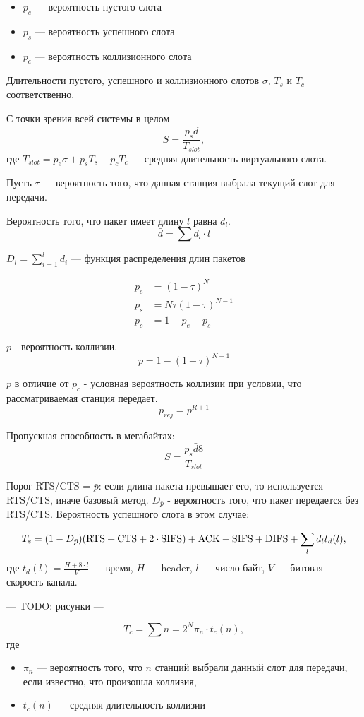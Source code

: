\begin{itemize}
\item $p_e$ --- вероятность пустого слота
\item $p_s$ --- вероятность успешного слота
\item $p_c$ --- вероятность коллизионного слота
\end{itemize}

Длительности пустого, успешного и коллизионного слотов $\sigma$, $T_s$ и $T_c$ соответственно.

С точки зрения всей системы в целом
\[ S = \frac{p_s \bar{d}}{T_{slot}}, \]
где $T_{slot} = p_e \sigma + p_s T_s + p_c T_c$ --- средняя длительность виртуального слота.

Пусть $\tau$ --- вероятность того, что данная станция выбрала текущий слот для передачи.

Вероятность того, что пакет имеет длину $l$ равна $d_l$. $$\bar{d} = \sum d_l \cdot l$$

$D_l = \sum\limits_{i = 1}^{l} d_i$ --- функция распределения длин пакетов

\begin{align*}
p_e &= (1 - \tau)^N \\
p_s &= N \tau (1 - \tau)^{N - 1} \\
p_c &= 1 - p_e - p_s
\end{align*}

$p$ - вероятность коллизии.
\[
p = 1 - (1 - \tau)^{N-1}
\]

$p$ в отличие от $p_c$ - условная вероятность коллизии при условии, что рассматриваемая станция передает.
\[
p_{rej} = p^{R+1}
\]

Пропускная способность в мегабайтах:
\[
S = \frac{p_s  \bar{d} 8}{T_{slot}}
\]

Порог RTS/CTS = $\bar{p}$: если длина пакета превышает его, то используется RTS/CTS, иначе базовый метод. 
$D_{\bar{p}}$ - вероятность того, что пакет передается без RTS/CTS.
Вероятность успешного слота в этом случае:

\[
T_s = (1 - D_{\bar{p}}) (\text{RTS} + \text{CTS} + 2 \cdot \text{SIFS}) +
\text{ACK} + \text{SIFS} + \text{DIFS} + \sum_l d_l t_d(l),
\]
где $t_d(l) = \frac{H + 8 \cdot l}{V}$ --- время, $H$ --- header, $l$ --- число байт, $V$ --- битовая скорость канала.

--- TODO: рисунки ---

\[
T_c = \sum{n=2}^N \pi_n \cdot t_c(n),
\]
где
\begin{itemize}
\item $\pi_n$ --- вероятность того, что $n$ станций выбрали данный слот для передачи, если известно, что произошла коллизия,
\item $t_c(n)$ --- средняя длительность коллизии
\end{itemize}

